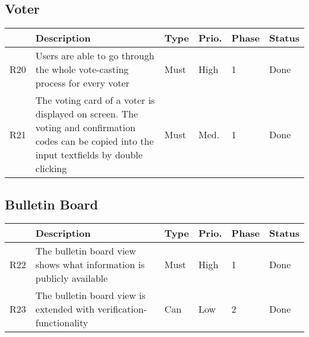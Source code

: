 \subsection{Voter}
\begin{longtable}{p{0.5cm}p{9cm}p{1cm}p{1cm}p{1cm}p{1cm}}
\hline
 & Description & Type & Prio. & Phase & Status\\
\hline
R20 & Users are able to go through the whole vote-casting process for every voter & Must & High & 1 & Done\\
R21 & The voting card of a voter is displayed on screen. The voting and confirmation codes can be copied into the input textfields by double clicking & Must & Med. & 1 & Done\\
\end{longtable}


\subsection{Bulletin Board}
\begin{longtable}{p{0.5cm}p{9cm}p{1cm}p{1cm}p{1cm}p{1cm}}
\hline
 & Description & Type & Prio. & Phase & Status\\
\hline
R22 & The bulletin board view shows what information is publicly available & Must & High & 1 & Done\\
R23 & The bulletin board view is extended with verification-functionality & Can & Low & 2 & Done\\
\end{longtable}

